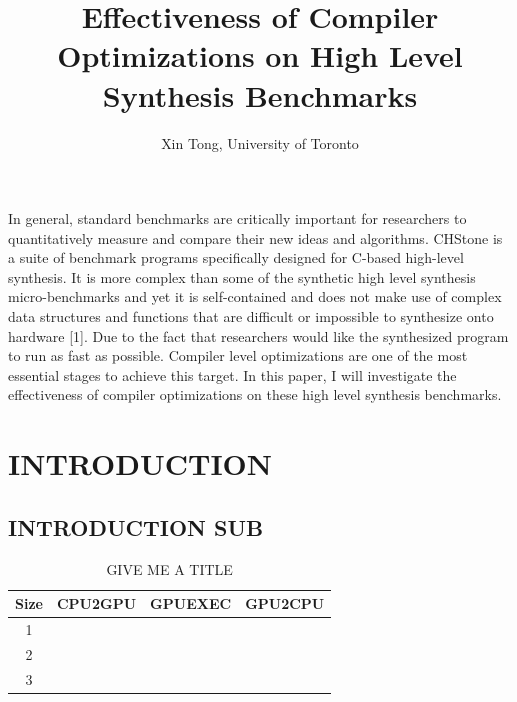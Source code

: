 \documentclass[6pt,twocolumn]{article}
\begin{document}
\title{Effectiveness of Compiler Optimizations on High Level Synthesis Benchmarks}
\author{Xin Tong, University of Toronto}

\maketitle
In general,  standard benchmarks are critically important for researchers to quantitatively measure and compare their new ideas and algorithms. CHStone is a suite of benchmark programs specifically designed for C-based high-level synthesis. It is more complex than some of the synthetic high level synthesis micro-benchmarks and yet it is self-contained and does not make use of complex data structures and functions that are difficult or impossible to synthesize onto hardware [1].
Due to the fact that researchers would like the synthesized program to run as fast as possible. Compiler level optimizations are one of the most essential stages to achieve this target. In this paper, I will investigate the effectiveness of compiler optimizations on these high level synthesis benchmarks.


\section{\fontsize{8}{4}\selectfont INTRODUCTION}
\subsection{\fontsize{8}{4}\selectfont INTRODUCTION SUB}

\smallskip 
\medskip

\newpage


\begin{table}[ht]
\caption{GIVE ME A TITLE} %
\centering %
\begin{tabular}{c c c c} %
\hline\hline %
Size & CPU2GPU & GPUEXEC & GPU2CPU \\ [0.5ex] %
\hline %
1 &   &  &  \\
2 &   &  &  \\
3 &   &  &  \\
\hline %
\end{tabular}
\label{table:nonlin} %
\end{table}
\end{document}
